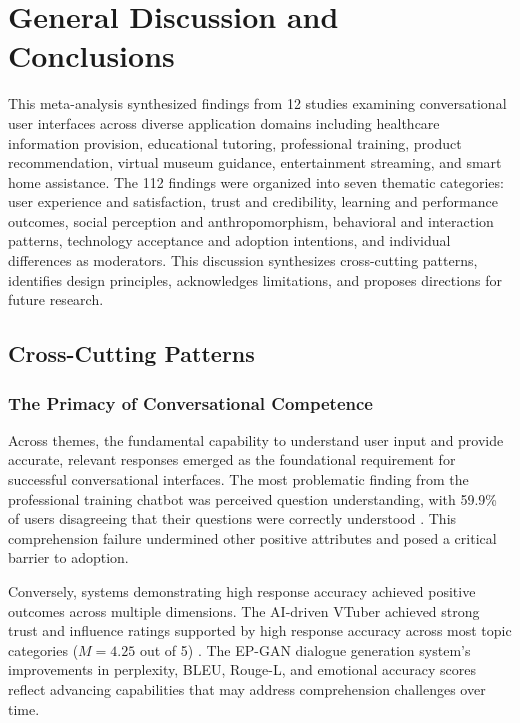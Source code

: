 \documentclass[manuscript,anonymous,sigconf]{acmart}
\begin{document}
\section{General Discussion and Conclusions}

This meta-analysis synthesized findings from 12 studies examining conversational user interfaces across diverse application domains including healthcare information provision, educational tutoring, professional training, product recommendation, virtual museum guidance, entertainment streaming, and smart home assistance. The 112 findings were organized into seven thematic categories: user experience and satisfaction, trust and credibility, learning and performance outcomes, social perception and anthropomorphism, behavioral and interaction patterns, technology acceptance and adoption intentions, and individual differences as moderators. This discussion synthesizes cross-cutting patterns, identifies design principles, acknowledges limitations, and proposes directions for future research.

\subsection{Cross-Cutting Patterns}

\subsubsection{The Primacy of Conversational Competence}

Across themes, the fundamental capability to understand user input and provide accurate, relevant responses emerged as the foundational requirement for successful conversational interfaces. The most problematic finding from the professional training chatbot was perceived question understanding, with 59.9\% of users disagreeing that their questions were correctly understood \cite{A54}. This comprehension failure undermined other positive attributes and posed a critical barrier to adoption.

Conversely, systems demonstrating high response accuracy achieved positive outcomes across multiple dimensions. The AI-driven VTuber achieved strong trust and influence ratings supported by high response accuracy across most topic categories ($M = 4.25$ out of 5) \cite{A81}. The EP-GAN dialogue generation system's improvements in perplexity, BLEU, Rouge-L, and emotional accuracy scores \cite{A47} reflect advancing capabilities that may address comprehension challenges over time.
\end{document}
